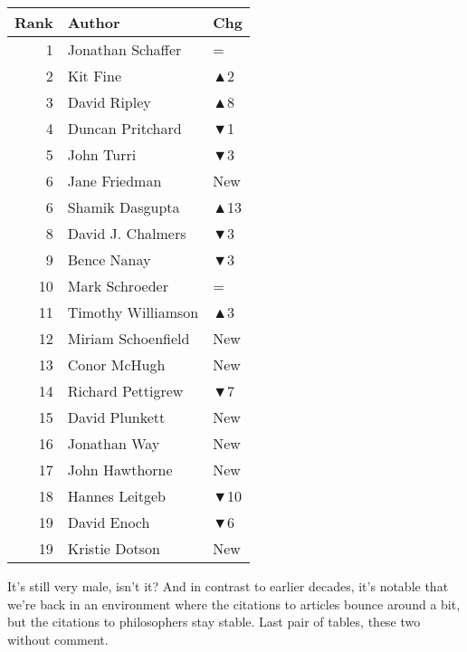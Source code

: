 \documentclass[
  10pt,
  letterpaper,
  DIV=11,
  numbers=noendperiod,
  twoside]{scrartcl}
\begin{document}
\begin{table}
\begin{minipage}{0.50\linewidth}
{\begin{tabular}{rll}
\toprule
Rank & Author & Chg\\
\midrule
1 & Jonathan Schaffer & =\\
2 & Kit Fine & \textcolor[RGB]{34,178,34}{▲2}\\
3 & David Ripley & \textcolor[RGB]{34,178,34}{▲8}\\
4 & Duncan Pritchard & \textcolor[RGB]{178,34,34}{▼1}\\
5 & John Turri & \textcolor[RGB]{178,34,34}{▼3}\\
6 & Jane Friedman & \textcolor[RGB]{34,178,34}{New}\\
6 & Shamik Dasgupta & \textcolor[RGB]{34,178,34}{▲13}\\
8 & David J. Chalmers & \textcolor[RGB]{178,34,34}{▼3}\\
9 & Bence Nanay & \textcolor[RGB]{178,34,34}{▼3}\\
10 & Mark Schroeder & =\\
11 & Timothy Williamson & \textcolor[RGB]{34,178,34}{▲3}\\
12 & Miriam Schoenfield & \textcolor[RGB]{34,178,34}{New}\\
13 & Conor McHugh & \textcolor[RGB]{34,178,34}{New}\\
14 & Richard Pettigrew & \textcolor[RGB]{178,34,34}{▼7}\\
15 & David Plunkett & \textcolor[RGB]{34,178,34}{New}\\
16 & Jonathan Way & \textcolor[RGB]{34,178,34}{New}\\
17 & John Hawthorne & \textcolor[RGB]{34,178,34}{New}\\
18 & Hannes Leitgeb & \textcolor[RGB]{178,34,34}{▼10}\\
19 & David Enoch & \textcolor[RGB]{178,34,34}{▼6}\\
19 & Kristie Dotson & \textcolor[RGB]{34,178,34}{New}\\
\bottomrule
\end{tabular}

}

\end{minipage}%

\end{table}%

It's still very male, isn't it? And in contrast to earlier decades, it's
notable that we're back in an environment where the citations to
articles bounce around a bit, but the citations to philosophers stay
stable. Last pair of tables, these two without comment.
\end{document}

